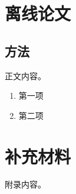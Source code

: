 \documentclass{ctexbook}
\begin{document}
\tableofcontents
\chapter{离线论文}
\section{方法}
正文内容。
\begin{enumerate}[label=\arabic*.]\item 第一项\item 第二项\end{enumerate}
\appendix\chapter{补充材料}附录内容。
\end{document}
